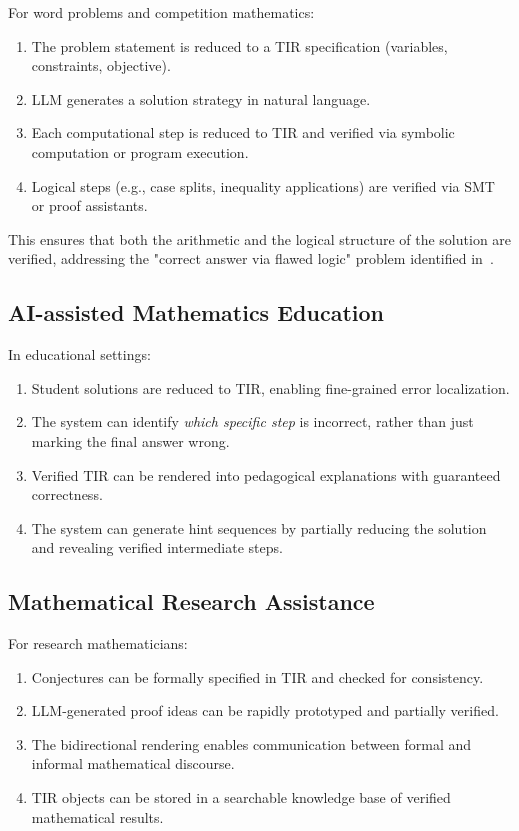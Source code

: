\documentclass[11pt,a4paper]{article}
\begin{document}
For word problems and competition mathematics:
\begin{enumerate}[leftmargin=*]
    \item The problem statement is reduced to a TIR specification (variables, constraints, objective).
    \item LLM generates a solution strategy in natural language.
    \item Each computational step is reduced to TIR and verified via symbolic computation or program execution.
    \item Logical steps (e.g., case splits, inequality applications) are verified via SMT or proof assistants.
\end{enumerate}
This ensures that both the arithmetic and the logical structure of the solution are verified, addressing the "correct answer via flawed logic" problem identified in~\cite{liang2024mathcheck}.

\subsection{AI-assisted Mathematics Education}

In educational settings:
\begin{enumerate}[leftmargin=*]
    \item Student solutions are reduced to TIR, enabling fine-grained error localization.
    \item The system can identify \textit{which specific step} is incorrect, rather than just marking the final answer wrong.
    \item Verified TIR can be rendered into pedagogical explanations with guaranteed correctness.
    \item The system can generate hint sequences by partially reducing the solution and revealing verified intermediate steps.
\end{enumerate}

\subsection{Mathematical Research Assistance}

For research mathematicians:
\begin{enumerate}[leftmargin=*]
    \item Conjectures can be formally specified in TIR and checked for consistency.
    \item LLM-generated proof ideas can be rapidly prototyped and partially verified.
    \item The bidirectional rendering enables communication between formal and informal mathematical discourse.
    \item TIR objects can be stored in a searchable knowledge base of verified mathematical results.
\end{enumerate}
\end{document}
